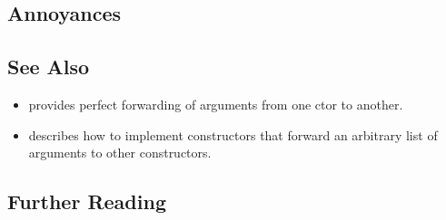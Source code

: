 \subsection[Annoyances]{Annoyances}\label{annoyances}

\hspace*{\fill}

\subsection[See Also]{See Also}\label{see-also}

\begin{itemize}
\item{provides perfect forwarding of arguments from one ctor to another.}
\item{describes how to implement constructors that forward an arbitrary list of arguments to other constructors.}
\end{itemize}

\subsection[Further Reading]{Further Reading}\label{further-reading}

\hspace*{\fill}



